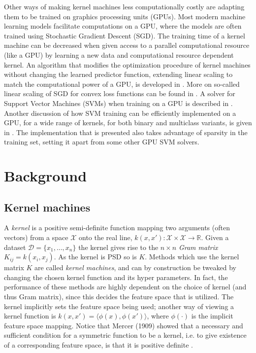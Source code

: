 \documentclass{article}
\theoremstyle{plain}
\theoremstyle{definition}
\theoremstyle{remark}
\begin{document}
Other ways of making kernel machines less computationally costly are adapting them to be trained on graphics processing units (GPUs). Most modern machine learning models facilitate computations on a GPU, where the models are often trained using Stochastic Gradient Descent (SGD). The training time of a kernel machine can be decreased when given access to a parallel computational resource (like a GPU) by learning a new data and computational resource dependent kernel. An algorithm that modifies the optimization procedure of kernel machines without changing the learned predictor function, extending linear scaling to match the computational power of a GPU, is developed in \cite{belkin}. More on so-called linear scaling of SGD for convex loss functions can be found in \cite{Ma}. A solver for Support Vector Machines (SVMs) when training on a GPU is described in \cite{sundaram_acceleratingmachine} . Another discussion of how SVM training can be efficiently implemented on a GPU, for a wide range of kernels, for both binary and multiclass variants, is given in \cite{cotter}. The implementation that is presented also takes advantage of sparsity in the training set, setting it apart from some other GPU SVM solvers. 


\section{Background}
\subsection{Kernel machines}
A \textit{kernel} is a positive semi-definite function mapping two arguments (often vectors) from a space $\mathcal{X}$ onto the real line, $k(x,x'): \mathcal{X} \times \mathcal{X} \rightarrow \mathbb{R}$.
Given a dataset $\mathcal{D} = \{x_1, \hdots, x_n\}$ the kernel gives rise to the $n \times n$ \textit{Gram matrix} $K_{ij} = k(x_i, x_j)$.
As the kernel is PSD so is $K$.
Methods which use the kernel matrix $K$ are called \textit{kernel machines}, and can by construction be tweaked by changing the chosen kernel function and its hyper parameters. In fact, the performance of these methods are highly dependent on the choice of kernel (and thus Gram matrix), since this decides the feature space that is utilized. The kernel implicitly sets the feature space being used; another way of viewing a kernel function is $k(x,x') = \langle \phi (x), \phi (x') \rangle$, where $\phi (\cdot)$ is the implicit feature space mapping. Notice that Mercer (1909) showed that a necessary and sufficient condition for a symmetric function to be a kernel, i.e. to give existence of a corresponding feature space, is that it is positive definite \cite{genton}.
\end{document}

